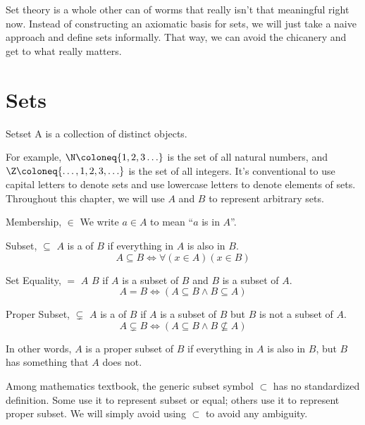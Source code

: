 Set theory is a whole other can of worms that really isn't that meaningful right now. Instead of constructing an axiomatic basis for sets, we will just take a naive approach and define sets informally. That way, we can avoid the chicanery and get to what really matters.

\section{Sets}

\begin{dfnbox}{Set}{set}
    A  is a collection of distinct objects.
\end{dfnbox}

For example, $\N \coloneq \{1,2,3\ldots\}$ is the set of all natural numbers, and $\Z \coloneq \{ \ldots, 1, 2, 3, \ldots\}$ is the set of all integers. It's conventional to use capital letters to denote sets and use lowercase letters to denote elements of sets. Throughout this
chapter, we will use $A$ and $B$ to represent arbitrary sets.

\begin{dfnbox}{Membership, $\in$}{}
    We write $a \in A$ to mean ``$a$ is in $A$''.
\end{dfnbox}

\begin{dfnbox}{Subset, $\subseteq$}{}
    $A$ is a  of $B$ if everything in $A$ is also in $B$.
    \tcblower
    \[ A \subseteq B \iff \forall(x \in A)(x \in B) \]
\end{dfnbox}

\begin{dfnbox}{Set Equality, $=$}{}
    $A$  $B$ if $A$ is a subset of $B$ and $B$ is a subset of $A$.
    \tcblower
    \[ A = B \iff (A \subseteq B \land B \subseteq A) \]
\end{dfnbox}

\begin{dfnbox}{Proper Subset, $\subsetneq$}{}
    $A$ is a  of $B$ if $A$ is a subset of $B$ but $B$ is not a subset of $A$.
    \tcblower
    \[ A \subsetneq B \iff (A \subseteq B \land B \not\subseteq A) \]
\end{dfnbox}

In other words, $A$ is a proper subset of $B$ if everything in $A$ is also in $B$, but $B$ has something that $A$ does not.

\begin{notebox}
    Among mathematics textbook, the generic subset symbol $\subset$ has no standardized definition. Some use it to represent subset or equal; others use it to represent proper subset. We will simply avoid using $\subset$ to avoid any ambiguity.
\end{notebox}

